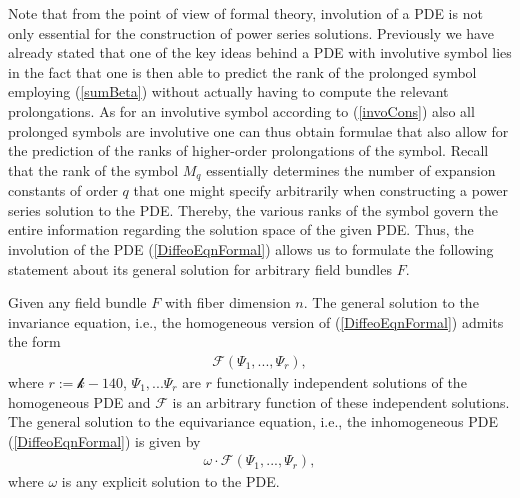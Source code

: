 Note that from the point of view of formal theory, involution of a PDE is not only essential for the construction of power series solutions. Previously we have already stated that one of the key ideas behind a PDE with involutive symbol lies in the fact that one is then able to predict the rank of the prolonged symbol employing (\ref{sumBeta}) without actually having to compute the relevant prolongations. As for an involutive symbol according to (\ref{invoCons}) also all prolonged symbols are involutive one can thus obtain formulae that also allow for the prediction of the ranks of higher-order prolongations of the symbol. Recall that the rank of the symbol $M_q$ essentially determines the number of expansion constants of order $q$ that one might specify arbitrarily when constructing a power series solution to the PDE. Thereby, the various ranks of the symbol govern the entire information regarding the solution space of the given PDE.
Thus, the involution of the PDE (\ref{DiffeoEqnFormal}) allows us to formulate the following statement about its general solution for arbitrary field bundles $F$.
\begin{theorem}\label{GeneralSol}
Given any field bundle $F$ with fiber dimension $n$. The general solution to the invariance equation, i.e., the homogeneous version of (\ref{DiffeoEqnFormal}) admits the form
\begin{align}
    \mathcal{F} \left (\Psi_1,...,\Psi_r \right ),
\end{align}
where $r:=\mathcal{k}-140$, $\Psi_1,...\Psi_r$ are $r$ functionally independent solutions of the homogeneous PDE and $\mathcal{F}$ is an arbitrary function of these independent solutions. The general solution to the equivariance equation, i.e., the inhomogeneous PDE (\ref{DiffeoEqnFormal}) is given by
\begin{align}
    \omega \cdot \mathcal{F} \left (\Psi_1,...,\Psi_r \right ),
\end{align}
where $\omega$ is any explicit solution to the PDE. 
\end{theorem}
